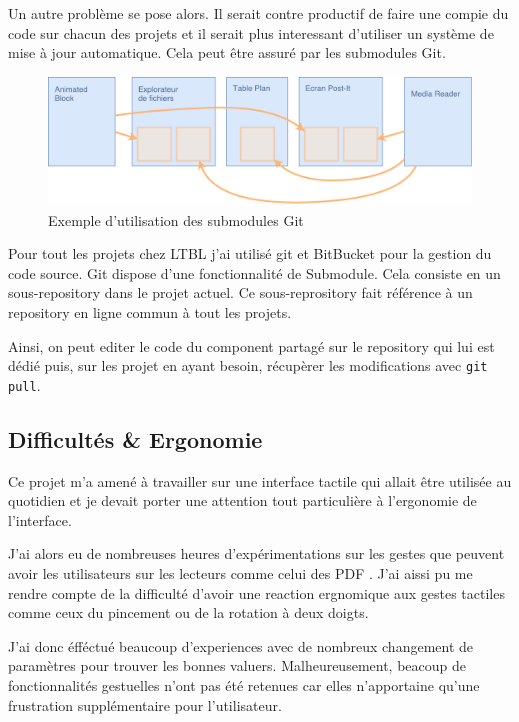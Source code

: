 Un autre problème se pose alors.
Il serait contre productif de faire une compie du code sur chacun des projets et il serait plus interessant d'utiliser un système de mise à jour automatique.
Cela peut être assuré par les submodules Git.

\begin{figure}[h]
    \centering
    \includegraphics[scale=0.5]{img/submodules.pdf}
    \caption{Exemple d'utilisation des submodules Git}
\end{figure}

Pour tout les projets chez LTBL j'ai utilisé git et BitBucket pour la gestion du code source.
Git dispose d'une fonctionnalité de Submodule.
Cela consiste en un sous-repository dans le projet actuel.
Ce sous-reprository fait référence à un repository en ligne commun à tout les projets.

Ainsi, on peut editer le code du component partagé sur le repository qui lui est dédié puis, sur les projet en ayant besoin, récupèrer les modifications avec \texttt{git pull}.

\subsection{Difficultés \& Ergonomie}

Ce projet m'a amené à travailler sur une interface tactile qui allait être utilisée au quotidien et je devait porter une attention tout particulière à l'ergonomie de l'interface.

J'ai alors eu de nombreuses heures d'expérimentations sur les gestes que peuvent avoir les utilisateurs sur les lecteurs comme celui des PDF .
J'ai aissi pu me rendre compte de la difficulté d'avoir une reaction ergnomique aux gestes tactiles comme ceux du pincement ou de la rotation à deux doigts.

J'ai donc éfféctué beaucoup d'experiences avec de nombreux changement de paramètres pour trouver les bonnes valuers.
Malheureusement, beacoup de fonctionnalités gestuelles n'ont pas été retenues car elles n'apportaine qu'une frustration supplémentaire pour l'utilisateur.

